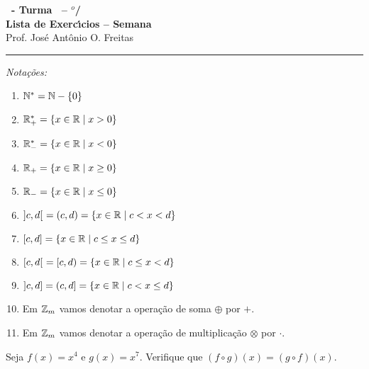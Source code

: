 \documentclass[12pt]{exam}
\begin{document}
    \begin{center}
        {\Large\bf \disciplina\ - Turma \turma\ -- \semestre$^{o}$/\ano} \\ \vspace{9pt} {\large\bf
            Lista de Exerc{\'\i}cios -- Semana \numerosemana}\\ \vspace{9pt} Prof. Jos{\'e} Ant{\^o}nio O. Freitas
    \end{center}
    \hrule

    \vspace{.6cm}

    \begin{center}
        \textit{Nota\c{c}\~oes:}
    \end{center}
    \begin{multicols}{2}
        \begin{enumerate}[label={\roman*})]
            \item $\mathbb{N}^* = \mathbb{N} - \{0\}$
            \item $\mathbb{R}^*_+ = \{x \in \mathbb{R} \mid x > 0\}$
            \item $\mathbb{R}^*_- = \{x \in \mathbb{R} \mid x < 0\}$
            \item $\mathbb{R}_+ = \{x \in \mathbb{R} \mid x \ge 0\}$
            \item $\mathbb{R}_- = \{x \in \mathbb{R} \mid x \le 0\}$
            \item $]c,d[\ = (c,d) = \{x \in \mathbb{R} \mid c < x < d\}$
            \item $[c,d] = \{x \in \mathbb{R} \mid c \le x \le d\}$
            \item $[c,d[\ = [c, d) = \{x \in \mathbb{R} \mid c \le x < d\}$
            \item $]c,d] = (c, d] = \{x \in \mathbb{R} \mid c < x \le d\}$
            \item Em $\mathbb{Z}_m$ vamos denotar a opera\c{c}\~ao de soma $\oplus$ por $+$.
            \item Em $\mathbb{Z}_m$ vamos denotar a opera\c{c}\~ao de multiplica\c{c}\~ao $\otimes$ por $\cdot$.
        \end{enumerate}
    \end{multicols}

    \vspace{.6cm}

    \questao{} Seja $f(x) = x^4$ e $g(x) = x^7$. Verifique que $(f\circ g)(x) = (g\circ f)(x)$.

    \vspace{.3cm}
\end{document}
